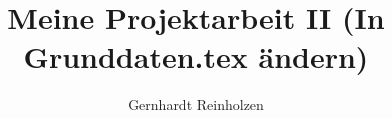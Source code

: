 
\title{Meine Projektarbeit II (In Grunddaten.tex ändern)}
\author{Gernhardt Reinholzen}

\newcommand{\Kurs}{WI13C}
\newcommand{\guardian}{Prof. David R. Hart}
\newcommand{\company}{mongoloid GmBH}

